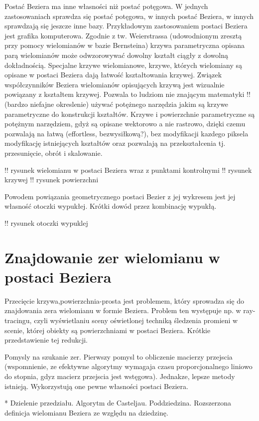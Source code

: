 \documentclass[11pt,a4paper,oneside]{report}
\begin{document}
Postać Beziera ma inne własności niż postać potęgowa. W jednych zastosowaniach sprawdza się postać potęgowa, w innych postać Beziera, w innych sprawdzają się jeszcze inne bazy. Przykładowym zastosowaniem postaci Beziera jest grafika komputerowa. Zgodnie z tw. Weierstrassa (udowodnionym zresztą przy pomocy wielomianów w bazie Bernsteina) krzywa parametryczna opisana parą wielomianów może odwzorowywać dowolny kształt ciągły z dowolną dokładnością. Specjalne krzywe wielomianowe, krzywe, których wielomiany są opisane w postaci Beziera dają łatwość kształtowania krzywej. Związek współczynników Beziera wielomianów opisujących krzywą jest wizualnie powiązany z kształtem krzywej. Pozwala to ludziom nie znającym matematyki !! (bardzo niefajne okreslenie) używać potężnego narzędzia jakim są krzywe parametryczne do konstrukcji kształtów. Krzywe i powierzchnie parametryczne są potężnym narzędziem, gdyż są opisane wektorowo a nie rastrowo, dzięki czemu pozwalają na łatwą (effortless, bezwysiłkową?), bez modyfikacji kazdego piksela modyfikację istniejących kształtów oraz pozwalają na przekształcenia tj. przesunięcie, obrót i skalowanie.

!! rysunek wielomianu w postaci Beziera wraz z punktami kontrolnymi
!! rysunek krzywej
!! rysunek powierzchni

Powodem powiązania geometrycznego postaci Bezier z jej wykresem jest jej własność otoczki wypukłej. Krótki dowód przez kombinację wypukłą.

!! rysunek otoczki wypuklej

\section{Znajdowanie zer wielomianu w postaci Beziera}

Przecięcie {krzywa,powierzchnia}-prosta jest problemem, który sprowadza się do znajdowania zera wielomianu w formie Beziera. Problem ten występuje np. w ray-tracingu, czyli wyświetlaniu sceny oświetlonej techniką śledzenia promieni w scenie, której obiekty są powierzchniami w postaci Beziera. Krótkie przedstawienie tej redukcji.

Pomysly na szukanie zer. Pierwszy pomysl to obliczenie macierzy przejscia (wspomnienie, ze efektywne algorytmy wymagaja czasu proporcjonalnego liniowo do stopnia, gdyz macierz przejscia jest wstęgowa). Jednakze, lepsze metody istnieją. Wykorzystują one pewne własności postaci Beziera.

* Dzielenie przedziału. Algorytm de Casteljau. Poddziedzina. Rozszerzona definicja wielomianu Beziera ze względu na dziedzinę.
\end{document}

